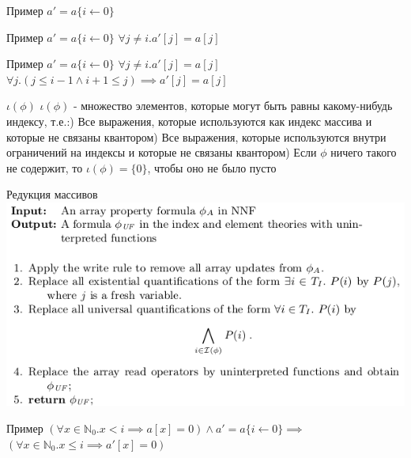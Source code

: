 \documentclass{beamer}
\begin{document}
\begin{frame}{Пример}
$a' = a\{i\leftarrow 0\}$\newline
\end{frame}

\begin{frame}{Пример}
$a' = a\{i\leftarrow 0\}$\newline
$\forall j \ne i. a'[j] = a[j]$\newline
\end{frame}

\begin{frame}{Пример}
$a' = a\{i\leftarrow 0\}$\newline
$\forall j \ne i. a'[j] = a[j]$\newline
$\forall j. (j \le i - 1 \wedge i + 1 \le j) \implies a'[j] = a[j]$
\end{frame}

\begin{frame}{$\iota(\phi)$}
$\iota(\phi)$ - множество элементов, которые могут быть равны какому-нибудь индексу, т.е.:) Все выражения, которые используются как индекс массива и которые не связаны квантором) Все выражения, которые используются внутри ограничений на индексы и которые не связаны квантором) Если $\phi$ ничего такого не содержит, то $\iota(\phi) = \{0\}$, чтобы оно не было пусто\newline
\end{frame}

\begin{frame}{Редукция массивов}
\includegraphics[scale=0.5]{array-reduction.png}
\end{frame}

\begin{frame}{Пример}
$(\forall x \in \mathbb{N}_0. x < i \implies a[x] = 0) \wedge a' = a\{i\leftarrow 0\} \implies$\newline
$(\forall x \in \mathbb{N}_0. x \le i \implies a'[x] = 0)$
\end{frame}
\end{document}
